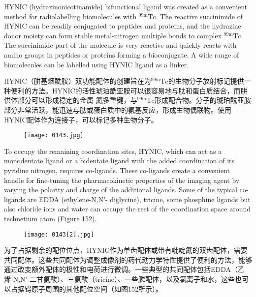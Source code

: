 \documentclass[dvipsnames, svgnames,a4paper,11pt]{article}
\begin{document}
HYNIC (hydrazinonicotinamide) bifunctional ligand was created as a convenient
method for radiolabelling biomolecules with ${}^\mathrm{99m}\mathrm{Tc}$. The reactive succinimide of HYNIC can be readily conjugated to peptides and proteins, and the hydrazine donor
moiety can form stable metal-nitrogen multiple bonds to complex ${}^\mathrm{99m}\mathrm{Tc}$. The
succinimide part of the molecule is very reactive and quickly reacts with amino
groups in peptides or proteins forming a bioconjugate. A wide range of biomolecules
can be labelled using HYNIC ligand as a linker.

HYNIC（肼基烟酰胺）双功能配体的创建旨在为${}^\mathrm{99m}\mathrm{Tc}$的生物分子放射标记提供一种便利的方法。HYNIC的活性琥珀酰亚胺可以很容易地与肽和蛋白质结合，而肼供体部分可以形成稳定的金属-氮多重键，与${}^\mathrm{99m}\mathrm{Tc}$形成配合物。分子的琥珀酰亚胺部分非常活跃，能迅速与肽或蛋白质中的氨基反应，形成生物偶联物。使用HYNIC配体作为连接子，可以标记多种生物分子。

\begin{figure}[h]
	\centering
    \texttt{[image: 0143.jpg]}    
     \label{fig151}
\end{figure}

To occupy the remaining coordination sites, HYNIC, which can act as a monodentate
ligand or a bidentate ligand with the added coordination of its pyridine nitrogen,
requires co-ligands. These co-ligands create a convenient handle for fine-tuning the
pharmacokinetic properties of the imaging agent by varying the polarity and charge
of the additional ligands. Some of the typical co-ligands are EDDA (ethylene-N,N'-
diglycine), tricine, some phosphine ligands but also chloride ions and water can
occupy the rest of the coordination space around technetium atom (Figure 152). 

\begin{figure}[H]
	\centering
    \texttt{[image: 0143[2].jpg]}    
     \label{fig152}
\end{figure}

为了占据剩余的配位位点，HYNIC作为单齿配体或带有吡啶氮的双齿配体，需要共同配体。这些共同配体为调整成像剂的药代动力学特性提供了便利的方法，能够通过改变额外配体的极性和电荷进行微调。一些典型的共同配体包括EDDA（乙烯-N,N'-二甘氨酸）、三氨酸（tricine）、一些膦配体，以及氯离子和水，这些也可以占据锝原子周围的其他配位空间（如图152所示）。
\end{document}
